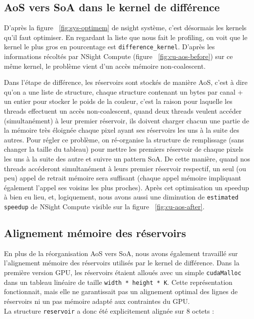 \documentclass[12pt]{article}
\begin{document}
    \subsection{AoS vers SoA dans le kernel de différence}
    D'après la figure ~\ref{fig:sys-optimem} de nsight système, c'est désormais les kernels qu'il faut optimiser. En regardant la liste que nous fait le profiling, on voit que le kernel le plus gros en pourcentage est \texttt{difference\_kernel}. D'après les informations récoltés par NSight Compute (figure ~\ref{fig:cu-aos-before}) sur ce même kernel, le problème vient d'un accès mémoire non-coalescent.
    \newline

    Dans l'étape de différence, les réservoirs sont stockés de manière AoS, c'est à dire qu'on a une liste de structure, chaque structure contenant un bytes par canal + un entier pour stocker le poids de la couleur, c'est la raison pour laquelle les threads effectuent un accès non-coalescent, quand deux threads veulent accéder (simultanément) à leur premier réservoir, ils doivent charger chacun une partie de la mémoire très éloignée chaque pixel ayant ses réservoirs les uns à la suite des autres.
    Pour régler ce problème, on ré-organise la structure de remplissage (sans changer la taille du tableau) pour mettre les premiers réservoir de chaque pixels les uns à la suite des autre et suivre un pattern SoA. De cette manière, quand nos threads accéderont simultanément à leurs premier réservoir respectif, un seul (ou peu) appel de retrait mémoire sera suffisant (chaque appel mémoire impliquant également l'appel ses voisins les plus proches).
    \newline
    Après cet optimisation un speedup à bien eu lieu, et, logiquement, nous avons aussi une diminution de \texttt{estimated speedup} de NSight Compute visible sur la figure ~\ref{fig:cu-aos-after}.


    \subsection{Alignement mémoire des réservoirs}
    En plus de la réorganisation AoS vers SoA, nous avons également travaillé sur l'alignement mémoire des réservoirs utilisés par le kernel de différence. Dans la première version GPU, les réservoirs étaient alloués avec un simple \verb|cudaMalloc| dans un tableau linéaire de taille \verb|width * height * K|. Cette représentation fonctionnait, mais elle ne garantissait pas un alignement optimal des lignes de réservoirs ni un pas mémoire adapté aux contraintes du GPU.
    \\
    La structure \verb|reservoir| a donc été explicitement alignée sur 8 octets :
\end{document}
